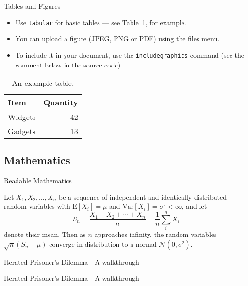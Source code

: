 \documentclass{beamer}
\begin{document}
\begin{frame}{Tables and Figures}

\begin{itemize}
\item Use \texttt{tabular} for basic tables --- see Table~\ref{tab:widgets}, for example.
\item You can upload a figure (JPEG, PNG or PDF) using the files menu. 
\item To include it in your document, use the \texttt{includegraphics} command (see the comment below in the source code).
\end{itemize}


\begin{table}
\centering
\begin{tabular}{l|r}
Item & Quantity \\\hline
Widgets & 42 \\
Gadgets & 13
\end{tabular}
\caption{\label{tab:widgets}An example table.}
\end{table}

\end{frame}

\subsection{Mathematics}

\begin{frame}{Readable Mathematics}

Let $X_1, X_2, \ldots, X_n$ be a sequence of independent and identically distributed random variables with $\text{E}[X_i] = \mu$ and $\text{Var}[X_i] = \sigma^2 < \infty$, and let
$$S_n = \frac{X_1 + X_2 + \cdots + X_n}{n}
      = \frac{1}{n}\sum_{i}^{n} X_i$$
denote their mean. Then as $n$ approaches infinity, the random variables $\sqrt{n}(S_n - \mu)$ converge in distribution to a normal $\mathcal{N}(0, \sigma^2)$.
\end{frame}
\begin{frame}{Iterated Prisoner's Dilemma - A walkthrough}
\end{frame}
\begin{frame}{Iterated Prisoner's Dilemma - A walkthrough}
\end{frame}
\end{document}
